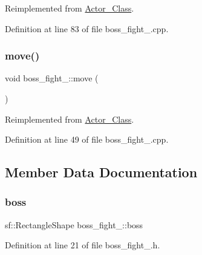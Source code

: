 Reimplemented from \hyperlink{class_actor___class_ab33216a3ce0c856bdc16231c71ae35c2}{Actor\+\_\+\+Class}.



Definition at line 83 of file boss\+\_\+fight\+\_.\+cpp.

\hypertarget{classboss__fight__1_a2ecde11495757971f23f45e78f23c5f7}{}\label{classboss__fight__1_a2ecde11495757971f23f45e78f23c5f7} 
\subsubsection{\texorpdfstring{move()}{move()}}
{\footnotesize\ttfamily void boss\+\_\+fight\+\_\+::move (\begin{DoxyParamCaption}{ }\end{DoxyParamCaption})\hspace{0.3cm}{\ttfamily [virtual]}}



Reimplemented from \hyperlink{class_actor___class_af1764a94c5410ba8476f56553cd2c327}{Actor\+\_\+\+Class}.



Definition at line 49 of file boss\+\_\+fight\+\_.\+cpp.



\subsection{Member Data Documentation}
\hypertarget{classboss__fight__1_a1bbb6010e2d4fce0052b99b66968e694}{}\label{classboss__fight__1_a1bbb6010e2d4fce0052b99b66968e694} 
\subsubsection{\texorpdfstring{boss}{boss}}
{\footnotesize\ttfamily sf\+::\+Rectangle\+Shape boss\+\_\+fight\+\_\+::boss}



Definition at line 21 of file boss\+\_\+fight\+\_.\+h.

\hypertarget{classboss__fight__1_ab020b6b32106cae5a2bdddef0443e5eb}{}\label{classboss__fight__1_ab020b6b32106cae5a2bdddef0443e5eb} 
